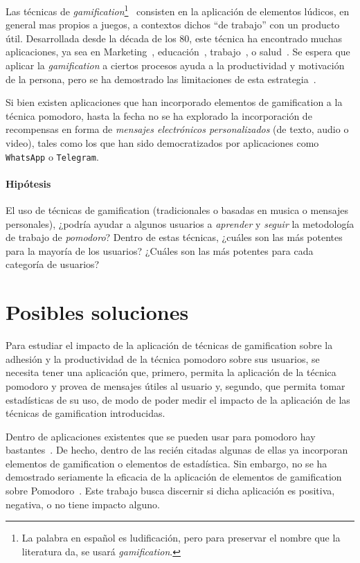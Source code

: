 \documentclass[12pt,letterpaper]{report}
\let\oldparagraph\paragraph
\renewcommand{\paragraph}[1]{\oldparagraph{#1}\mbox{}}
\begin{document}
Las técnicas de \emph{gamification}\footnote{La palabra en español es
ludificación, pero para preservar el nombre que la literatura da, se
usará \emph{gamification}.}~\cite{deterding2011gamification} consisten
en la aplicación de elementos lúdicos, en general mas propios a
juegos, a contextos dichos ``de trabajo'' con un producto útil.
Desarrollada desde la década de los 80, este técnica ha encontrado
muchas aplicaciones, ya sea en Marketing~\cite{hamari2010game},
educación~\cite{desousa2014systematic-gamification},
trabajo~\cite{oravec2015gamification}, o
salud~\cite{pereira2014gamification-review}. Se espera que aplicar la
\emph{gamification} a ciertos procesos ayuda a la productividad y
motivación de la persona, pero se ha demostrado las limitaciones de
esta estrategia~\cite{hamari2014gamification}.

Si bien existen aplicaciones que han incorporado elementos de
gamification a la técnica pomodoro, hasta la fecha no se ha explorado
la incorporación de recompensas en forma de \emph{mensajes
electrónicos personalizados} (de texto, audio o video), tales como los
que han sido democratizados por aplicaciones como \texttt{WhatsApp} o
\texttt{Telegram}.

\paragraph{Hipótesis} El uso de técnicas de gamification
(tradicionales o basadas en musica o mensajes personales), ¿podría
ayudar a algunos usuarios a \emph{aprender} y \emph{seguir} la
metodología de trabajo de \emph{pomodoro}? Dentro de estas técnicas,
¿cuáles son las más potentes para la mayoría de los usuarios? ¿Cuáles
son las más potentes para cada categoría de usuarios?

\newpage
\section{Posibles soluciones}\label{posibles-soluciones}

Para estudiar el impacto de la aplicación de técnicas de gamification
sobre la adhesión y la productividad de la técnica pomodoro sobre sus
usuarios, se necesita tener una aplicación que, primero, permita la
aplicación de la técnica pomodoro y provea de mensajes útiles al
usuario y, segundo, que permita tomar estadísticas de su uso, de modo
de poder medir el impacto de la aplicación de las técnicas de
gamification introducidas.

Dentro de aplicaciones existentes que se pueden usar para pomodoro hay
bastantes~\cite{forest-stayfocused, focus-extension, pomodorium,
teamviz}. De hecho, dentro de las recién citadas algunas de ellas ya
incorporan elementos de gamification o elementos de estadística. Sin
embargo, no se ha demostrado seriamente la eficacia de la aplicación
de elementos de gamification sobre
Pomodoro~\cite{hamari2014gamification}. Este trabajo busca discernir
si dicha aplicación es positiva, negativa, o no tiene impacto alguno.
\end{document}
